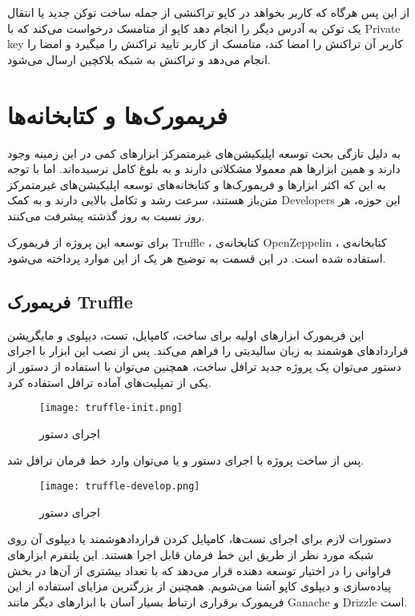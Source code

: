 از این پس هرگاه که کاربر بخواهد در کاپو تراکنشی از جمله ساخت توکن جدید یا انتقال یک توکن به آدرس دیگر را انجام دهد کاپو از متامسک درخواست می‌کند که با
\gls{Private key}
کاربر آن تراکنش را امضا کند، متامسک از کاربر تایید تراکنش را میگیرد و امضا را انجام می‌دهد و تراکنش به شبکه بلاکچین ارسال می‌شود.


\section{فریمورک‌ها و کتابخانه‌ها}
به دلیل تازگی بحث توسعه اپلیکیشن‌های غیرمتمرکز ابزارهای کمی در این زمینه وجود دارند و همین ابزارها هم معمولا مشکلاتی دارند و به بلوغ کامل نرسیده‌اند. اما با توجه به این که اکثر ابزارها و فریمورک‌ها و کتابخانه‌های توسعه اپلیکیشن‌های غیرمتمرکز متن‌باز هستند، سرعت رشد و تکامل بالایی دارند و به کمک
\glspl{Developer}
این حوزه، هر روز نسبت به روز گذشته پیشرفت می‌کنند.

برای توسعه این پروژه از
فریمورک Truffle
،
کتابخانه‌ی OpenZeppelin
،
کتابخانه‌ی
استفاده شده است. در این قسمت به توضیح هر یک از این موارد پرداخته می‌شود.

\subsection{فریمورک Truffle}
این فریمورک ابزارهای اولیه برای ساخت، کامپایل، تست، دیپلوی و مایگریشن قراردادهای هوشمند به زبان سالیدیتی را فراهم می‌کند. پس از نصب این ابزار با اجرای دستور
می‌توان یک پروژه جدید ترافل ساخت، همچنین می‌توان با استفاده از دستور
از یکی از تمپلیت‌های آماده ترافل استفاده کرد.

\begin{figure}[ht]
\centerline{\texttt{[image: truffle-init.png]}}
\caption{اجرای دستور }
\label{fig:truffle-init}
\end{figure}

پس از ساخت پروژه با اجرای دستور
و یا
 می‌توان وارد خط فرمان ترافل شد.

\begin{figure}[ht]
\centerline{\texttt{[image: truffle-develop.png]}}
\caption{اجرای دستور }
\label{fig:truffle-develop}
\end{figure}

دستورات لازم برای اجرای تست‌ها، کامپایل کردن قراردادهوشمند یا دیپلوی آن روی شبکه مورد نظر از طریق این خط فرمان قابل اجرا هستند. این پلتفرم ابزارهای فراوانی را در اختیار توسعه دهنده قرار می‌دهد که با تعداد بیشتری از آن‌ها در بخش پیاده‌سازی و دیپلوی کاپو آشنا می‌شویم. همچنین از بزرگترین مزایای استفاده از این فریمورک برقراری ارتباط بسیار آسان با ابزارهای دیگر مانند Ganache و Drizzle است.

